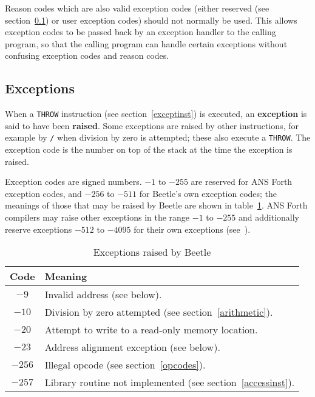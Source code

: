 \documentclass[english]{article}
\newlength{\opcode}\opcode=0.5in
\begin{document}
Reason codes which are also valid exception codes (either reserved (see section~\ref{exceptions})
or user exception codes) should not normally be used. This
allows exception codes to be passed back by an exception handler to the calling
program, so that the calling program can handle certain exceptions without
confusing exception codes and reason codes.


\subsection{Exceptions}
\label{exceptions}

When a {\tt THROW} instruction (see section~\ref{exceptinst}) is executed, an
{\bf exception} is said to have been {\bf raised}. Some exceptions are raised by
other instructions, for example by {\tt /} when division by zero is attempted;
these also execute a {\tt THROW}. The exception code is the number on top of the
stack at the time the exception is raised.

Exception codes are signed numbers. $-1$ to $-255$ are reserved for ANS Forth
exception codes, and $-256$ to $-511$ for Beetle's own exception codes; the meanings
of those that may be raised by Beetle are shown in table~\ref{excepttable}. ANS
Forth compilers may raise other exceptions in the range $-1$ to $-255$ and
additionally reserve exceptions $-512$ to $-4095$ for their own exceptions
(see~\cite[section 9.3.1]{ANSIforth}).

\begin{table}[htbp]
\begin{center}
\begin{tabular}{cl} \toprule
\bf Code & \bf Meaning \\ \midrule
$-9$ & Invalid address (see below). \\
$-10$ & Division by zero attempted (see section~\ref{arithmetic}). \\
$-20$ & Attempt to write to a read-only memory location. \\
$-23$ & Address alignment exception (see below). \\
$-256$ & Illegal opcode (see section~\ref{opcodes}). \\
$-257$ & Library routine not implemented (see section~\ref{accessinst}). \\ \bottomrule
\end{tabular}
\caption{\label{excepttable}Exceptions raised by Beetle}
\end{center}
\end{table}
\end{document}
